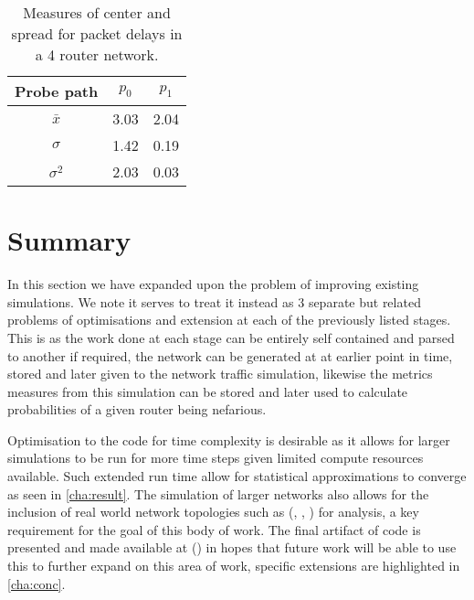 \begin{table}[H]
    \centering
    \begin{tabular}{||c c c||}
        \hline
        Probe path & $p_0$ & $p_1$ \\ [0.5ex]
        \hline\hline
        $\bar{x}$   & 3.03 & 2.04 \\
        $\sigma$    & 1.42 & 0.19 \\
        $\sigma^2$  & 2.03 & 0.03 \\ [1ex]
        \hline
    \end{tabular}
    \caption{Measures of center and spread for packet delays in a 4 router network.}
    \label{tbl:4routerstats}
\end{table}

\section{Summary}
\label{sec:Iintroductionsummary}

In this section we have expanded upon the problem of improving existing simulations. We note it serves to treat it instead as 3 separate but related problems of optimisations and extension at each of the previously listed stages. This is as the work done at each stage can be entirely self contained and parsed to another if required, the network can be generated at at earlier point in time, stored and later given to the network traffic simulation, likewise the metrics measures from this simulation can be stored and later used to calculate probabilities of a given router being nefarious.\par
Optimisation to the code for time complexity is desirable as it allows for larger simulations to be run for more time steps given limited compute resources available. Such extended run time allow for statistical approximations to converge as seen in \cref{cha:result}. The simulation of larger networks also allows for the inclusion of real world network topologies such as (\cite{cadi_caida_2002}, \cite{university_of_washington_rocketfuel_2002}, \cite{medina_brite_2001}) for analysis, a key requirement for the goal of this body of work. The final artifact of code is presented and made available at (\cite{sylvester_millar_real_2021}) in hopes that future work will be able to use this to further expand on this area of work, specific extensions are highlighted in \cref{cha:conc}.